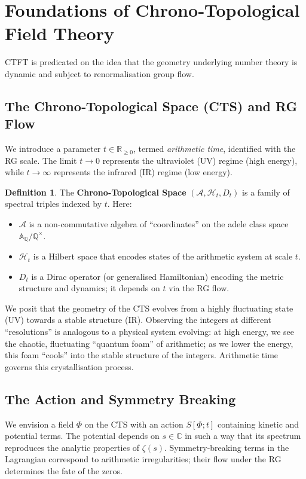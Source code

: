 \documentclass[11pt, a4paper]{article}
\theoremstyle{definition}
\newtheorem{definition}{Definition}[section]
\newcommand{\Q}{\mathbb{Q}}
\newcommand{\R}{\mathbb{R}}
\newcommand{\C}{\mathbb{C}}
\newcommand{\A}{\mathbb{A}}
\newcommand{\Hilb}{\mathcal{H}}
\newcommand{\Alg}{\mathscr{A}}
\begin{document}
\section{Foundations of Chrono‑Topological Field Theory}

CTFT is predicated on the idea that the geometry underlying number theory is dynamic and subject to renormalisation group flow.

\subsection{The Chrono‑Topological Space (CTS) and RG Flow}

We introduce a parameter $t\in\R_{\ge0}$, termed \emph{arithmetic time}, identified with the RG scale.  The limit $t\to0$ represents the ultraviolet (UV) regime (high energy), while $t\to\infty$ represents the infrared (IR) regime (low energy).

\begin{definition}
The \textbf{Chrono‑Topological Space} $(\Alg, \Hilb_t, D_t)$ is a family of spectral triples indexed by $t$.  Here:
\begin{itemize}
    \item $\Alg$ is a non‑commutative algebra of “coordinates” on the adele class space $\A_\Q/\Q^\times$.
    \item $\Hilb_t$ is a Hilbert space that encodes states of the arithmetic system at scale $t$.
    \item $D_t$ is a Dirac operator (or generalised Hamiltonian) encoding the metric structure and dynamics; it depends on $t$ via the RG flow.
\end{itemize}
\end{definition}

We posit that the geometry of the CTS evolves from a highly fluctuating state (UV) towards a stable structure (IR).  Observing the integers at different “resolutions” is analogous to a physical system evolving: at high energy, we see the chaotic, fluctuating “quantum foam” of arithmetic; as we lower the energy, this foam “cools” into the stable structure of the integers.  Arithmetic time governs this crystallisation process.

\subsection{The Action and Symmetry Breaking}

We envision a field $\Phi$ on the CTS with an action $S[\Phi; t]$ containing kinetic and potential terms.  The potential depends on $s\in\C$ in such a way that its spectrum reproduces the analytic properties of $\zeta(s)$.  Symmetry‑breaking terms in the Lagrangian correspond to arithmetic irregularities; their flow under the RG determines the fate of the zeros.
\end{document}
